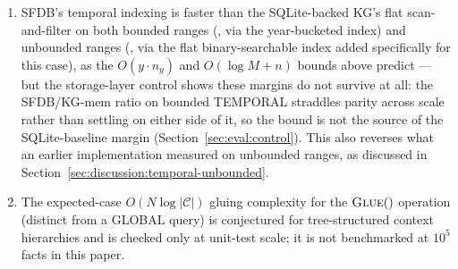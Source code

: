 \begin{enumerate}
          single open set at insert time rather than resolving membership
          at query time; both engines are $O(n)$ in the result size, so
          the gap is a constant-factor one, and it is the only query class
          where that constant factor is what the design itself, rather
          than the storage layer, is being tested on.
    \item SFDB's temporal indexing is faster than the SQLite-backed KG's
          flat scan-and-filter on both bounded ranges (\rangetemporalkg{},
          via the year-bucketed index) and unbounded ranges
          (\rangetemporalunbkg{}, via the flat binary-searchable index
          added specifically for this case), as the $O(y \cdot n_y)$ and
          $O(\log M + n)$ bounds above predict --- but the storage-layer
          control shows these margins do not survive at all: the SFDB/KG-mem
          ratio on bounded TEMPORAL straddles parity across scale rather
          than settling on either side of it, so the bound is not the
          source of the SQLite-baseline
          margin
          (Section~\ref{sec:eval:control}). This also reverses what an
          earlier implementation measured on unbounded ranges, as
          discussed in Section~\ref{sec:discussion:temporal-unbounded}.
    \item The expected-case $O(N \log |\mathcal{C}|)$ gluing complexity for
          the $\textsc{Glue}()$ operation (distinct from a GLOBAL query) is
          conjectured for tree-structured context hierarchies and is
          checked only at unit-test scale; it is not benchmarked at
          $10^5$ facts in this paper.
\end{enumerate}
